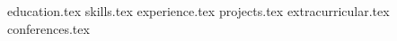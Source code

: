 \documentclass[11pt, a4paper]{awesome-cv}
\newcommand*{\sectiondir}{resume/}
\begin{document}
\makecvheader

{education.tex}
{skills.tex}
{experience.tex}
{projects.tex}
{extracurricular.tex}
{conferences.tex}
\end{document}
